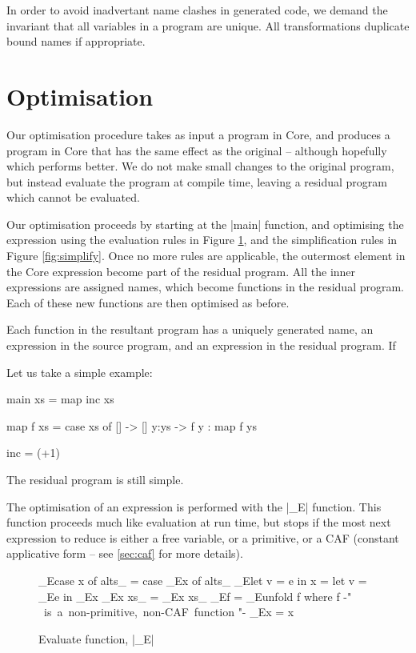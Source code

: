 \documentclass{llncs}
\begin{document}
In order to avoid inadvertant name clashes in generated code, we demand the invariant that all variables in a program are unique. All transformations duplicate bound names if appropriate.

\section{Optimisation}

Our optimisation procedure takes as input a program in Core, and produces a program in Core that has the same effect as the original -- although hopefully which performs better. We do not make small changes to the original program, but instead evaluate the program at compile time, leaving a residual program which cannot be evaluated.

Our optimisation proceeds by starting at the |main| function, and optimising the expression using the evaluation rules in Figure \ref{fig:evaluate}, and the simplification rules in Figure \ref{fig:simplify}. Once no more rules are applicable, the outermost element in the Core expression become part of the residual program. All the inner expressions are assigned names, which become functions in the residual program. Each of these new functions are then optimised as before.

Each function in the resultant program has a uniquely generated name, an expression in the source program, and an expression in the residual program. If 

Let us take a simple example:

\begin{code}
main xs = map inc xs

map f xs = case  xs of
                 []    -> []
                 y:ys  -> f y : map f ys

inc = (+1)
\end{code}

The residual program is still simple.




The optimisation of an expression is performed with the |_E| function. This function proceeds much like evaluation at run time, but stops if the most next expression to reduce is either a free variable, or a primitive, or a CAF (constant applicative form -- see \ref{sec:caf} for more details).


\begin{figure}[tb]
\begin{code}
_E\<case x of alts_  \> =  case _E\<x\> of alts_
_E\<let v = e in x   \> =  let v = _E\<e\> in _E\<x\>
_E\<x xs_            \> =  _E\<x\> xs_
_E\<f                \> =  _E\<unfold f\>
                           where f {-" \hbox{ is a non-primitive, non-CAF function} "-}
_E\<x                \> =  x
\end{code}
\caption{Evaluate function, |_E|}
\label{fig:evaluate}
\end{figure}
\end{document}

